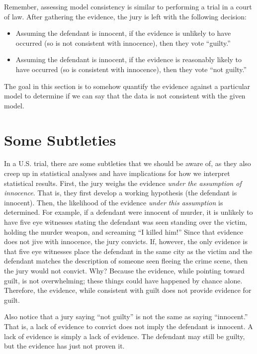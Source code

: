 \documentclass[]{book}
\providecommand{\tightlist}{%
  \setlength{\itemsep}{0pt}\setlength{\parskip}{0pt}}
\theoremstyle{definition}
\theoremstyle{definition}
\theoremstyle{definition}
\theoremstyle{remark}
\begin{document}
Remember, assessing model consistency is similar to performing a trial
in a court of law. After gathering the evidence, the jury is left with
the following decision:

\begin{itemize}
\tightlist
\item
  Assuming the defendant is innocent, if the evidence is unlikely to
  have occurred (so is not consistent with innocence), then they vote
  ``guilty.''
\item
  Assuming the defendant is innocent, if the evidence is reasonably
  likely to have occurred (so is consistent with innocence), then they
  vote ``not guilty.''
\end{itemize}

The goal in this section is to somehow quantify the evidence against a
particular model to determine if we can say that the data is not
consistent with the given model.

\section{Some Subtleties}\label{some-subtleties}

In a U.S. trial, there are some subtleties that we should be aware of,
as they also creep up in statistical analyses and have implications for
how we interpret statistical results. First, the jury weighs the
evidence \emph{under the assumption of innocence}. That is, they first
develop a working hypothesis (the defendant is innocent). Then, the
likelihood of the evidence \emph{under this assumption} is determined.
For example, if a defendant were innocent of murder, it is unlikely to
have five eye witnesses stating the defendant was seen standing over the
victim, holding the murder weapon, and screaming ``I killed him!'' Since
that evidence does not jive with innocence, the jury convicts. If,
however, the only evidence is that five eye witnesses place the
defendant in the same city as the victim and the defendant matches the
description of someone seen fleeing the crime scene, then the jury would
not convict. Why? Because the evidence, while pointing toward guilt, is
not overwhelming; these things could have happened by chance alone.
Therefore, the evidence, while consistent with guilt does not provide
evidence for guilt.

Also notice that a jury saying ``not guilty'' is not the same as saying
``innocent.'' That is, a lack of evidence to convict does not imply the
defendant is innocent. A lack of evidence is simply a lack of evidence.
The defendant may still be guilty, but the evidence has just not proven
it.
\end{document}
